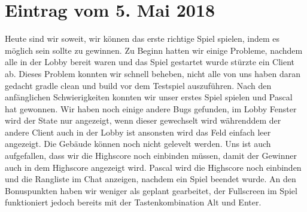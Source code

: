 \documentclass{scrartcl}
\newcommand{\n}{\newline}
\begin{document}
\section*{Eintrag vom 5. Mai 2018}
Heute sind wir soweit, wir können das erste richtige Spiel spielen, indem es möglich sein sollte zu gewinnen.\n
Zu Beginn hatten wir einige Probleme, nachdem alle in der Lobby bereit waren und das Spiel gestartet wurde stürzte ein Client ab. Dieses Problem konnten wir schnell beheben, nicht alle von uns haben daran gedacht gradle clean und build vor dem Testspiel auszuführen. Nach den anfänglichen Schwierigkeiten konnten wir unser erstes Spiel spielen und Pascal hat gewonnen. \n
Wir haben noch einige andere Bugs gefunden, im Lobby Fenster wird der State nur angezeigt, wenn dieser gewechselt wird währenddem der andere Client auch in der Lobby ist ansonsten wird das Feld einfach leer angezeigt. Die Gebäude können noch nicht gelevelt werden. \n
Uns ist auch aufgefallen, dass wir die Highscore noch einbinden müssen, damit der Gewinner auch in dem Highscore angezeigt wird. \n
Pascal wird die Highscore noch einbinden und die Rangliste im Chat anzeigen, nachdem ein Spiel beendet wurde. An den Bonuspunkten haben wir weniger als geplant gearbeitet, der Fullscreen im Spiel funktioniert jedoch bereits mit der Tastenkombination Alt und Enter.
\end{document}
